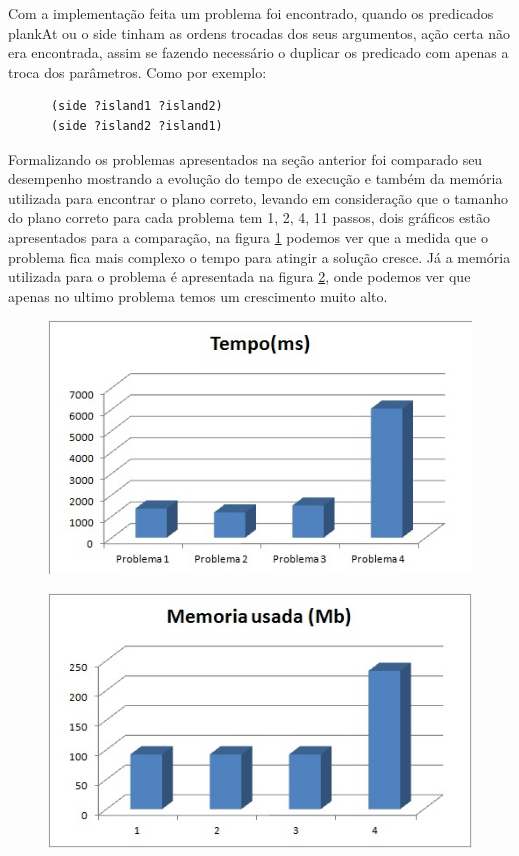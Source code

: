 \documentclass[letterpaper]{article}
\begin{document}
Com a implementação feita um problema foi encontrado, quando os predicados plankAt ou o side tinham as ordens trocadas dos seus argumentos, ação certa não era encontrada, assim se fazendo necessário o duplicar os predicado com apenas a troca dos parâmetros. Como por exemplo:
 \begin{verbatim}
      (side ?island1 ?island2)
      (side ?island2 ?island1)
\end{verbatim}

Formalizando os problemas apresentados na seção anterior foi comparado seu desempenho mostrando a evolução do tempo de execução e também da memória utilizada para encontrar o plano correto, levando em consideração que o tamanho do plano correto para cada problema tem 1, 2, 4, 11 passos, dois gráficos estão apresentados para a comparação, na figura \ref{tempo} podemos ver que a medida que o problema fica mais complexo o tempo para atingir a solução cresce.  Já a memória utilizada para o problema é apresentada na figura \ref{memoria}, onde podemos ver que apenas no ultimo problema temos um crescimento muito alto. 

\begin{figure}[ht]
\centering
\includegraphics[scale=0.6]{tempo.jpg}
\caption{}
\label{tempo}
\end{figure}

\begin{figure}[ht]
\centering
\includegraphics[scale=0.6]{memoria.jpg}
\caption{}
\label{memoria}
\end{figure}
\end{document}
